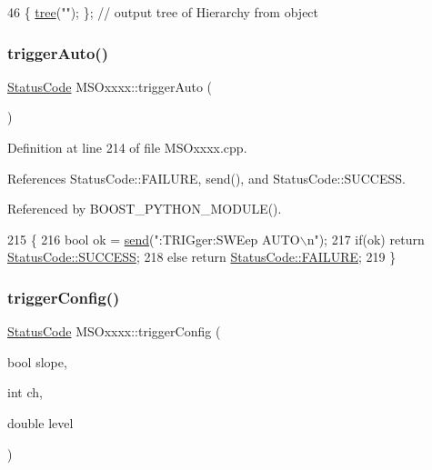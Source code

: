\begin{DoxyCode}
46 \{ \hyperlink{classHierarchy_a594c294c5f60c230e106d522ed008212}{tree}(\textcolor{stringliteral}{""}); \};                     \textcolor{comment}{// output tree of Hierarchy from object}
\end{DoxyCode}
\mbox{\label{classMSOxxxx_a44238c713464e76d4c3c2005413bdf76}} 
\subsubsection{\texorpdfstring{trigger\+Auto()}{triggerAuto()}}
{\footnotesize\ttfamily \hyperlink{classStatusCode}{Status\+Code} M\+S\+Oxxxx\+::trigger\+Auto (\begin{DoxyParamCaption}{ }\end{DoxyParamCaption})}



Definition at line 214 of file M\+S\+Oxxxx.\+cpp.



References Status\+Code\+::\+F\+A\+I\+L\+U\+RE, send(), and Status\+Code\+::\+S\+U\+C\+C\+E\+SS.



Referenced by B\+O\+O\+S\+T\+\_\+\+P\+Y\+T\+H\+O\+N\+\_\+\+M\+O\+D\+U\+L\+E().


\begin{DoxyCode}
215 \{
216     \textcolor{keywordtype}{bool} ok = \hyperlink{classMSOxxxx_ae77668a1ae4ccb74e0ed5f2485dfdebf}{send}(\textcolor{stringliteral}{":TRIGger:SWEep AUTO\(\backslash\)n"});
217     \textcolor{keywordflow}{if}(ok)  \textcolor{keywordflow}{return} \hyperlink{classStatusCode_a6f565cbeadc76d14c72f047e5e85eb4badd0da38d3ba0d922efd1f4619bc37ad8}{StatusCode::SUCCESS};
218     \textcolor{keywordflow}{else}        \textcolor{keywordflow}{return} \hyperlink{classStatusCode_a6f565cbeadc76d14c72f047e5e85eb4ba3da73d4c469762eb9d3c960368252b26}{StatusCode::FAILURE};  
219 \}
\end{DoxyCode}
\mbox{\label{classMSOxxxx_a9019b632465638a13c409d8243fe83b4}} 
\subsubsection{\texorpdfstring{trigger\+Config()}{triggerConfig()}}
{\footnotesize\ttfamily \hyperlink{classStatusCode}{Status\+Code} M\+S\+Oxxxx\+::trigger\+Config (\begin{DoxyParamCaption}\item[{bool}]{slope,  }\item[{int}]{ch,  }\item[{double}]{level }\end{DoxyParamCaption})}



